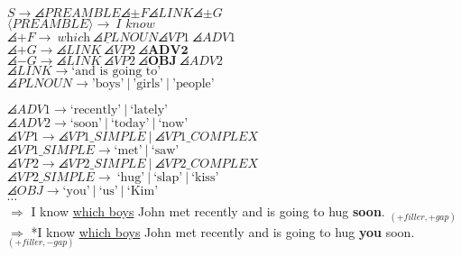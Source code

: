 \\
$S \rightarrow \angles{PREAMBLE} \angles{\pm F} \angles{LINK} \angles{\pm G} $
\\
$\langle PREAMBLE \rangle \rightarrow \ \textit{I know}$
\\
$\angles{+F} \rightarrow \ \underline{\textit{{which}}\  \angles{PLNOUN}} \angles{VP1}\ \angles{ADV1}$
\\
$\angles{+G} \rightarrow \angles{LINK}\ \angles{VP2}\ \angles{\textbf{ADV2}}$
\\
$\angles{-G} \rightarrow \angles{LINK}\ \angles{VP2}\ \angles{\textbf{OBJ}}\ \angles{ADV2}$
\\
$\angles{LINK} \rightarrow \text{`and is going to'}$
 \\ 

$\angles{PLNOUN} \rightarrow \text{'boys'}\ |\
\text{'girls'}\ |\ \text{'people'}$

$\angles{ADV1} \rightarrow \text{`recently'}\ |\ \text{`lately'}$
 \\ 
$\angles{ADV2} \rightarrow \text{`soon'}\ |\ \text{`today'}\ |\ \text{`now'}$
 \\ 
$\angles{VP1} \rightarrow \angles{VP1\_SIMPLE}\ |\ \angles{VP1\_COMPLEX}$
 \\ 
$\angles{VP1\_SIMPLE} \rightarrow \text{`met'}\ |\ \text{`saw'}$
 \\ 
$\angles{VP2} \rightarrow \angles{VP2\_SIMPLE}\ |\ \angles{VP2\_COMPLEX}$
 \\ 
$\angles{VP2\_SIMPLE} \rightarrow \ \text{`hug'}\ |\ \text{`slap'}\ |\ \text{`kiss'}$
 \\ 
 $\angles{OBJ} \rightarrow \text{`you'}\ |\ \text{`us'}\ |\ \text{`Kim'}$
\\
$\cdots$
\\

$\Rightarrow$ I know \underline{which boys} John met recently and is going to hug \textbf{soon}. $_{(+filler, +gap)}$
\\
$\Rightarrow$ *I know \underline{which boys} John met recently and is going to hug \textbf{you} soon. $_{(+filler, -gap)}$
\\
\\
\hline
\hline
